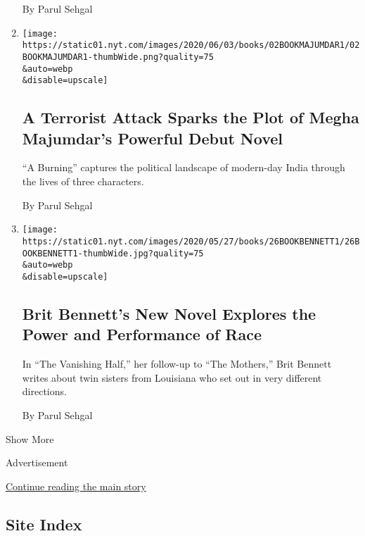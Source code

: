 \begin{enumerate}
  By Parul Sehgal
\item
  \href{/2020/06/02/books/review-burning-megha-majumdar.html}{}

  \texttt{[image: https://static01.nyt.com/images/2020/06/03/books/02BOOKMAJUMDAR1/02BOOKMAJUMDAR1-thumbWide.png?quality=75\\\&auto=webp\\\&disable=upscale]}

  \hypertarget{a-terrorist-attack-sparks-the-plot-of-megha-majumdars-powerful-debut-novel}{%
  \subsection{A Terrorist Attack Sparks the Plot of Megha Majumdar's
  Powerful Debut
  Novel}\label{a-terrorist-attack-sparks-the-plot-of-megha-majumdars-powerful-debut-novel}}

  ``A Burning'' captures the political landscape of modern-day India
  through the lives of three characters.

  By Parul Sehgal
\item
  \href{/2020/05/26/books/review-vanishing-half-brit-bennett.html}{}

  \texttt{[image: https://static01.nyt.com/images/2020/05/27/books/26BOOKBENNETT1/26BOOKBENNETT1-thumbWide.jpg?quality=75\\\&auto=webp\\\&disable=upscale]}

  \hypertarget{brit-bennetts-new-novel-explores-the-power-and-performance-of-race}{%
  \subsection{Brit Bennett's New Novel Explores the Power and
  Performance of
  Race}\label{brit-bennetts-new-novel-explores-the-power-and-performance-of-race}}

  In ``The Vanishing Half,'' her follow-up to ``The Mothers,'' Brit
  Bennett writes about twin sisters from Louisiana who set out in very
  different directions.

  By Parul Sehgal
\end{enumerate}

Show More

Advertisement

\protect\hyperlink{after-mid2}{Continue reading the main story}

\hypertarget{site-index}{%
\subsection{Site Index}\label{site-index}}

